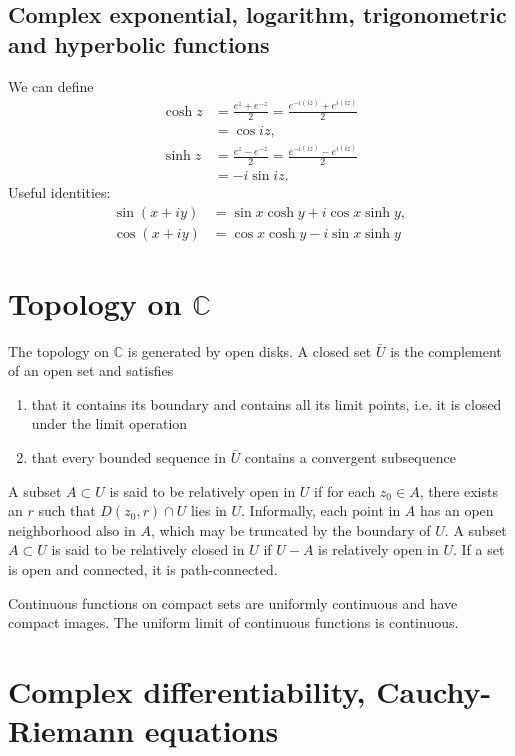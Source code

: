 \documentclass{article}
\begin{document}
\subsection{Complex exponential, logarithm,
                  trigonometric and hyperbolic functions}

We can define
\begin{align*}
   \cosh z
&= \frac{e^z + e^{-z}}{2}
 = \frac{e^{-i(iz)} + e^{i(iz)}}{2} \\
&= \cos iz, \\
   \sinh z
&= \frac{e^z - e^{-z}}{2}
 = \frac{e^{-i(iz)} - e^{i(iz)}}{2} \\
&= -i \sin iz.
\end{align*}
Useful identities:
\begin{align*}
   \sin (x + i y)
&= \sin x \cosh y
 + i \cos x \sinh y, \\
   \cos (x + i y)
&= \cos x \cosh y
 - i \sin x \sinh y
\end{align*}

\section{Topology on $\mathbb{C}$}

The topology on $\mathbb{C}$ is generated by open disks.
A closed set $\bar{U}$ is the complement of an open set
and satisfies
\begin{enumerate}
  \item{
    that it contains its boundary and contains all its
    limit points, i.e. it is closed under the limit operation
  }
  \item{
    that every bounded sequence in $\bar{U}$ contains a
    convergent subsequence
  }
\end{enumerate}

A subset $A \subset U$ is said to be relatively open in $U$ if
for each $z_0 \in A$, there exists an $r$ such that
$D(z_0, r) \cap U$ lies in $U$. Informally, each point in $A$ has an
open neighborhood also in $A$, which may be truncated by the boundary
of $U$.
A subset $A \subset U$ is said to be relatively closed in $U$
if $U - A$ is relatively open in $U$.
If a set is open and connected, it is path-connected.

Continuous functions on compact sets are uniformly continuous and have
compact images. The uniform limit of continuous functions is continuous.

\section{Complex differentiability, Cauchy-Riemann equations}
\end{document}
